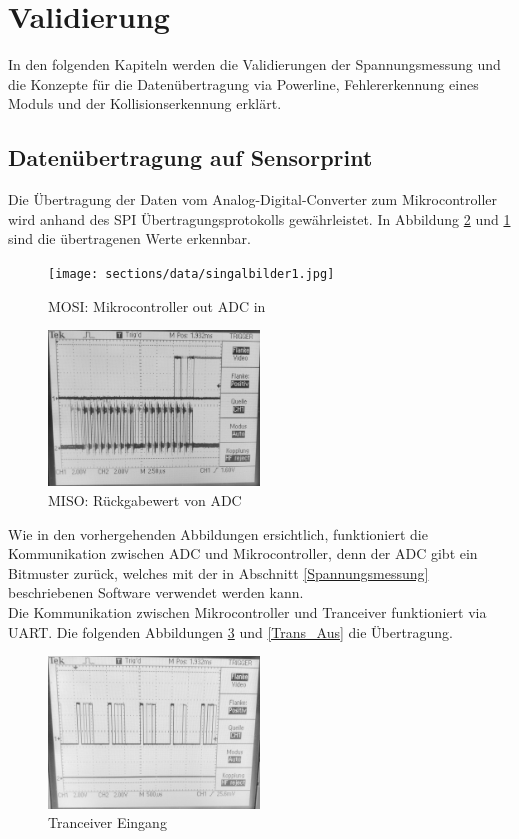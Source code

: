 \section{Validierung}
In den folgenden Kapiteln werden die Validierungen der Spannungsmessung und die Konzepte für die Datenübertragung via Powerline, Fehlererkennung eines Moduls und der Kollisionserkennung erklärt.
\subsection{Datenübertragung auf Sensorprint}
Die Übertragung der Daten vom Analog-Digital-Converter zum Mikrocontroller wird anhand des SPI Übertragungsprotokolls gewährleistet. In Abbildung \ref{SPI_MISO} und \ref{SPI_MOSI} sind die übertragenen Werte erkennbar. 
\begin{figure}[htb]
\centering
\texttt{[image: sections/data/singalbilder1.jpg]}
\caption{MOSI: Mikrocontroller out ADC in}
\label{SPI_MOSI}
\end{figure}

\begin{figure}[htb]
\centering
\includegraphics[width=0.5\textwidth]{sections/data/singalbilder3.jpg}
\caption{MISO: Rückgabewert von ADC}
\label{SPI_MISO}
\end{figure}

Wie in den vorhergehenden Abbildungen ersichtlich, funktioniert die Kommunikation zwischen ADC und Mikrocontroller, denn der ADC gibt ein Bitmuster zurück, welches mit der in Abschnitt \ref{Spannungsmessung} beschriebenen Software verwendet werden kann. \\
\newpage
Die Kommunikation zwischen Mikrocontroller und Tranceiver funktioniert via UART. Die folgenden Abbildungen \ref{Trans_Ein} und \ref{Trans_Aus} die Übertragung.
\begin{figure}[htb]
\centering
\includegraphics[width=0.5\textwidth]{sections/data/singalbilder8.jpg}
\caption{Tranceiver Eingang}
\label{Trans_Ein}
\end{figure}


